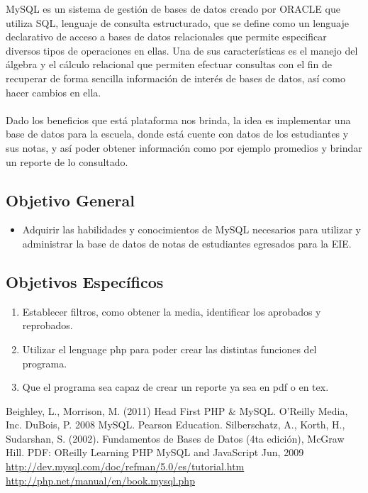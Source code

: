 \documentclass[12pt,journal,compsoc]{article}
\begin{document}
MySQL es un sistema de gestión de bases de datos creado por ORACLE que utiliza SQL, lenguaje de consulta estructurado, que se define como un lenguaje declarativo de acceso a bases de datos relacionales que permite especificar diversos tipos de operaciones en ellas. Una de sus características es el manejo del álgebra y el cálculo relacional que permiten efectuar consultas con el fin de recuperar de forma sencilla información de interés de bases de datos, así como hacer cambios en ella.\\\\
Dado los beneficios que está plataforma nos brinda, la idea es implementar una base de datos para la escuela, donde está cuente con datos de los estudiantes y sus notas, y así poder obtener información como por ejemplo promedios y brindar un reporte de lo consultado.
\subsection*{Objetivo General}
\begin{itemize}
\item Adquirir las habilidades y conocimientos de MySQL necesarios para utilizar y administrar la base de datos de notas de estudiantes egresados para la EIE.
\end{itemize}
\subsection*{Objetivos Específicos}
\begin{enumerate}
\item Establecer filtros, como obtener la media, identificar los aprobados y reprobados.
\item Utilizar el lenguage php para poder crear las distintas funciones del programa.
\item Que el programa sea capaz de crear un reporte ya sea en pdf o en tex.
\end{enumerate}
\begin{thebibliography}{6}
Beighley, L., Morrison, M. (2011) Head First PHP \& MySQL. O'Reilly Media, Inc.
DuBois, P. 2008 MySQL. Pearson Education.
 Silberschatz, A., Korth, H., Sudarshan, S. (2002). Fundamentos de Bases de Datos (4ta edición), McGraw Hill.
PDF: OReilly Learning PHP MySQL and JavaScript Jun, 2009
\bibitem{}\url{http://dev.mysql.com/doc/refman/5.0/es/tutorial.htm}
\url{http://php.net/manual/en/book.mysql.php}
\end{thebibliography}
\end{document}
